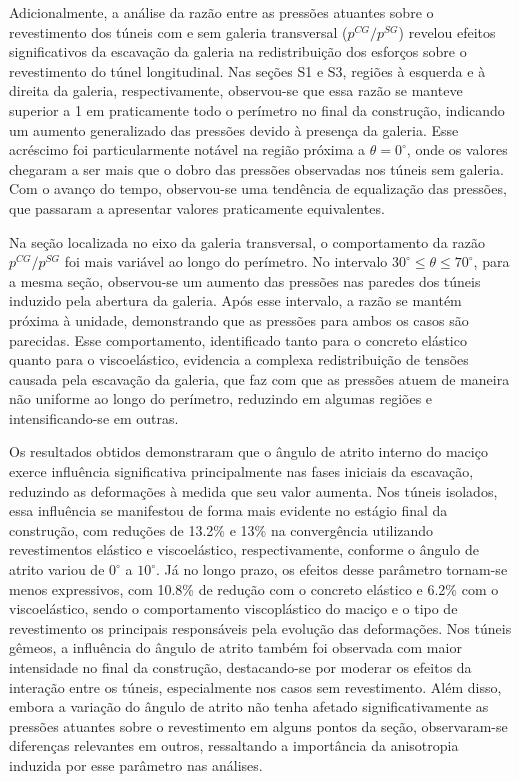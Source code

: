 Adicionalmente, a análise da razão entre as pressões atuantes sobre o revestimento dos túneis com e sem galeria transversal ($p^{CG}/p^{SG}$) revelou efeitos significativos da escavação da galeria na redistribuição dos esforços sobre o revestimento do túnel longitudinal. Nas seções S1 e S3, regiões à esquerda e à direita da galeria, respectivamente, observou-se que essa razão se manteve superior a 1 em praticamente todo o perímetro no final da construção, indicando um aumento generalizado das pressões devido à presença da galeria. Esse acréscimo foi particularmente notável na região próxima a $\theta = 0^\circ$, onde os valores chegaram a ser mais que o dobro das pressões observadas nos túneis sem galeria. Com o avanço do tempo, observou-se uma tendência de equalização das pressões, que passaram a apresentar valores praticamente equivalentes.

Na seção localizada no eixo da galeria transversal, o comportamento da razão $p^{CG}/p^{SG}$ foi mais variável ao longo do perímetro. No intervalo $30^\circ \leq \theta \leq 70^\circ$, para a mesma seção, observou-se um aumento das pressões nas paredes dos túneis induzido pela abertura da galeria. Após esse intervalo, a razão se mantém próxima à unidade, demonstrando que as pressões para ambos os casos são parecidas. Esse comportamento, identificado tanto para o concreto elástico quanto para o viscoelástico, evidencia a complexa redistribuição de tensões causada pela escavação da galeria, que faz com que as pressões atuem de maneira não uniforme ao longo do perímetro, reduzindo em algumas regiões e intensificando-se em outras.

Os resultados obtidos demonstraram que o ângulo de atrito interno do maciço exerce influência significativa principalmente nas fases iniciais da escavação, reduzindo as deformações à medida que seu valor aumenta. Nos túneis isolados, essa influência se manifestou de forma mais evidente no estágio final da construção, com reduções de 13.2\% e 13\% na convergência utilizando revestimentos elástico e viscoelástico, respectivamente, conforme o ângulo de atrito variou de $0^\circ$ a $10^\circ$. Já no longo prazo, os efeitos desse parâmetro tornam-se menos expressivos, com 10.8\% de redução com o concreto elástico e 6.2\% com o viscoelástico, sendo o comportamento viscoplástico do maciço e o tipo de revestimento os principais responsáveis pela evolução das deformações. Nos túneis gêmeos, a influência do ângulo de atrito também foi observada com maior intensidade no final da construção, destacando-se por moderar os efeitos da interação entre os túneis, especialmente nos casos sem revestimento. Além disso, embora a variação do ângulo de atrito não tenha afetado significativamente as pressões atuantes sobre o revestimento em alguns pontos da seção, observaram-se diferenças relevantes em outros, ressaltando a importância da anisotropia induzida por esse parâmetro nas análises.

